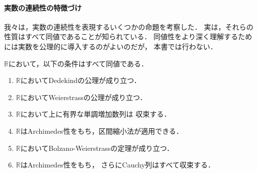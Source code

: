     \paragraph{実数の連続性の特徴づけ}
     我々は，実数の連続性を表現するいくつかの命題を考察した．
     実は，それらの性質はすべて同値であることが知られている．
     同値性をより深く理解するためには実数を公理的に導入するのがよいのだが，
     本書では行わない．
     \begin{thm}[連続性公理] \label{thm:jissudouti}
       $\mathbb{R}$において，以下の条件はすべて同値である．
       \begin{enumerate}
         \item $\mathbb{R}$においてDedekindの公理が成り立つ．
         \item $\mathbb{R}$においてWeierstrassの公理が成り立つ．
         \item $\mathbb{R}$において上に有界な単調増加数列は
           収束する．
         \item $\mathbb{R}$はArchimedes性をもち，区間縮小法が適用できる．
         \item $\mathbb{R}$においてBolzano-Weierstrassの定理が成り立つ．
         \item $\mathbb{R}$はArchimedes性をもち，
           さらにCauchy列はすべて収束する．
       \end{enumerate}
     \end{thm}
